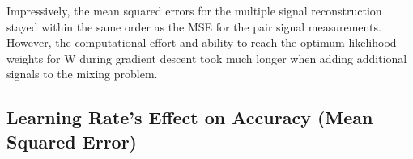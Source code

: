 \documentclass[12pt]{article}
\begin{document}
\FloatBarrier

\begin{table}[h!]
\centering
{}
\caption{Mean Squared Error of Signal Pairs}
\end{table}
\FloatBarrier
\noindent
Impressively, the mean squared errors for the multiple signal reconstruction stayed within the same order as the MSE for the pair signal measurements. However, the computational effort and ability to reach the optimum likelihood weights for W during gradient descent took much longer when adding additional signals to the mixing problem.

\subsection{Learning Rate's Effect on Accuracy (Mean Squared Error)}
\end{document}
